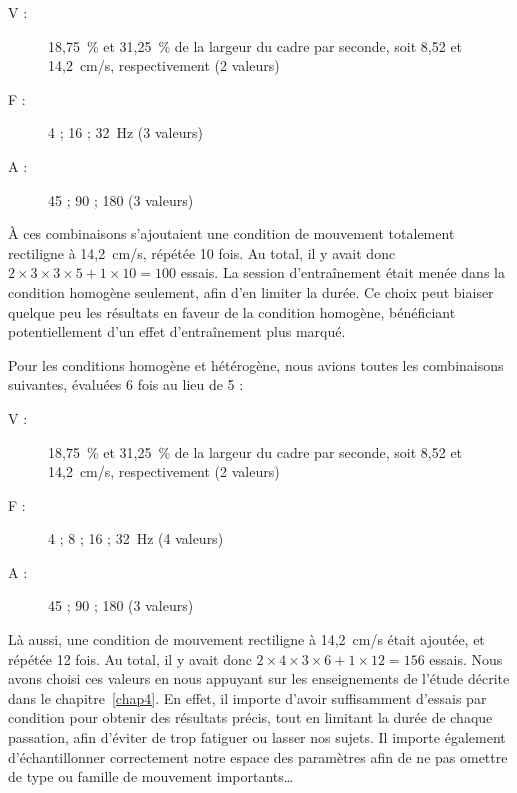 	\begin{description}
		\item[V :] 18,75~\%{} et 31,25~\%{} de la largeur du cadre par seconde, soit  8,52 et 14,2~cm/s, respectivement (2 valeurs)
		\item[F :] 4 ; 16 ; 32~Hz (3 valeurs)
		\item[A :] 45 ; 90 ; 180\textdegree{} (3 valeurs)
	\end{description}
	
	À ces combinaisons s'ajoutaient une condition de mouvement totalement rectiligne à 14,2~cm/s, répétée 10 fois. Au total, il y avait donc $2\times{}3\times{}3\times{}5+1\times{}10=100$ essais. La session d'entraînement était menée dans la condition homogène seulement, afin d'en limiter la durée. Ce choix peut biaiser quelque peu les résultats en faveur de la condition homogène, bénéficiant potentiellement d'un effet d'entraînement plus marqué.
	
	Pour les conditions homogène et hétérogène, nous avions toutes les combinaisons suivantes, évaluées 6 fois au lieu de 5 :
	
	\begin{description}
		\item[V :] 18,75~\%{} et 31,25~\%{} de la largeur du cadre par seconde, soit  8,52 et 14,2~cm/s, respectivement (2 valeurs)
		\item[F :] 4 ; 8 ; 16 ; 32~Hz (4 valeurs)
		\item[A :] 45 ; 90 ; 180\textdegree{} (3 valeurs)
	\end{description}
	
	Là aussi, une condition de mouvement rectiligne à 14,2~cm/s était ajoutée, et répétée 12 fois. Au total, il y avait donc $2\times{}4\times{}3\times{}6+1\times{}12=156$ essais. Nous avons choisi ces valeurs en nous appuyant sur les enseignements de l'étude décrite dans le chapitre~\ref{chap4}. En effet, il importe d'avoir suffisamment d'essais par condition pour obtenir des résultats précis, tout en limitant la durée de chaque passation, afin d'éviter de trop fatiguer ou lasser nos sujets. Il importe également d'échantillonner correctement notre espace des paramètres afin de ne pas omettre de \og type \fg{} ou \og famille \fg{} de mouvement importants\ldots{}
	
